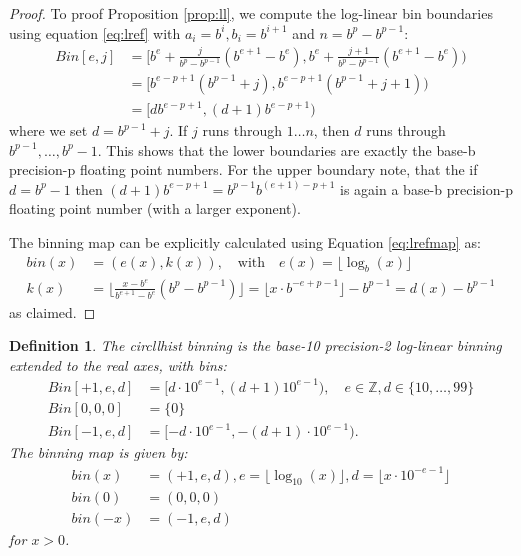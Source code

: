 \documentclass{article}
\theoremstyle{plain}
\newtheorem{definition}{Definition}[section]
\theoremstyle{remark}
\newcommand{\IZ}{\mathbb{Z}}
\newcommand{\qtext}[1]{\quad\text{#1}\quad} %
\newcommand{\floor}[1]{\lfloor#1\rfloor}
\begin{document}
\begin{proof}
  To proof Proposition \ref{prop:ll}, we compute the log-linear bin boundaries using equation \ref{eq:lref}
  with $a_i = b^i, b_i = b^{i+1}$ and $n = b^p - b^{p-1}$:
  \begin{align*}
    Bin[e,j] &= [ b^e + \frac{j}{b^p - b^{p-1}}(b^{e+1} - b^e), b^e + \frac{j + 1}{b^p - b^{p-1}}(b^{e+1} - b^e) ) \\
      &= [ b^{e-p+1}(b^{p-1} + j), b^{e-p+1}(b^{p-1} + j + 1) ) \\
      &= [ d b^{e-p+1}, (d + 1) b^{e-p+1} )
  \end{align*}
  where we set $d = b^{p-1} + j$. If $j$ runs through $1 \dots n$, then $d$ runs through $b^{p-1},\dots, b^p -1$.
  This shows that the lower boundaries are exactly the base-b precision-p floating point numbers.
  For the upper boundary note, that the if $d=b^p-1$ then $(d+1)b^{e-p+1} = b^{p-1} b^{(e+1)-p+1}$ is again
  a base-b precision-p floating point number (with a larger exponent).

  The binning map can be explicitly calculated using Equation \ref{eq:lrefmap} as:
  \begin{align*}
    bin(x) &= (e(x), k(x)), \qtext{with} e(x) = \floor{\log_b(x)} \\
    k(x) & = \floor{ \frac{x - b^{e}}{b^{e+1} - b^e} (b^p - b^{p-1}) }
    = \floor{x \cdot b^{-e + p - 1}} - b^{p-1}
    = d(x) - b^{p-1}
  \end{align*}
  as claimed.
\end{proof}

\begin{definition}\label{def:circllhist}
  The circllhist binning is the base-10 precision-2 log-linear binning extended to the real axes,
  with bins:
  \begin{align*}
    Bin[+1,e,d] &= [ d \cdot {10}^{e-1}, (d + 1) 10^{e-1} ), \quad e \in \IZ, d \in \{ 10, \dots, 99 \} \\
    Bin[0,0,0]  &= \{ 0 \} \\
    Bin[-1,e,d] &= [ -d \cdot {10}^{e-1}, -(d + 1) \cdot 10^{e-1} ).
  \end{align*}
  The binning map is given by:
  \begin{align*}
    bin(x)  &= (+1, e, d), e = \floor{\log_{10}(x)}, d = \floor{x \cdot 10^{-e - 1}} \\
    bin(0)  &= (0, 0, 0) \\
    bin(-x) &= (-1, e, d)
  \end{align*}
  for $x > 0$.
\end{definition}
\end{document}
